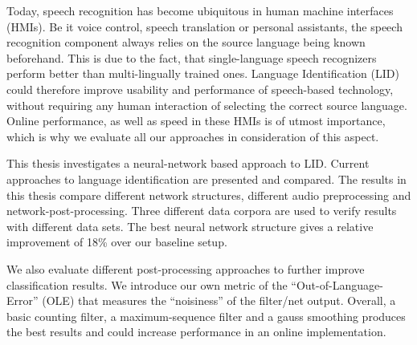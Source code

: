 
\Abstract
Today, speech recognition has become ubiquitous in human machine interfaces (HMIs). Be it voice control, speech translation or personal assistants, the speech recognition component always relies on the source language being known beforehand. This is due to the fact, that single-language speech recognizers perform better than multi-lingually trained ones. Language Identification  (LID) could therefore improve usability and performance of speech-based technology, without requiring any human interaction of selecting the correct source language. Online performance, as well as speed in these HMIs is of utmost importance, which is why we evaluate all our approaches in consideration of this aspect.

This thesis investigates a neural-network based approach to LID. Current approaches to language identification are presented and compared. The results in this thesis compare different network structures, different audio preprocessing and network-post-processing. Three different data corpora are used to verify results with different data sets. The best neural network structure gives a relative improvement of 18\% over our baseline setup.

We also evaluate different post-processing approaches to further improve classification results. We introduce our own metric of the ``Out-of-Language-Error'' (OLE) that measures the ``noisiness'' of the filter/net output. Overall, a basic counting filter, a maximum-sequence filter and a gauss smoothing produces the best results and could increase performance in an online implementation.



